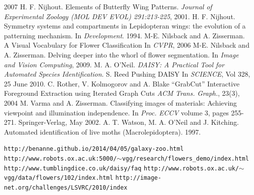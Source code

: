 \documentclass[11pt, titlepage, oneside]{article}
\theoremstyle{plain}
\theoremstyle{definition}
\theoremstyle{remark}
\begin{document}
\begin{thebibliography}{2}
		2007
		H. F. Nijhout.
		Elements of Butterfly Wing Patterns.
		\emph{Journal of Experimental Zoology (MOL DEV EVOL) 291:213-225},
		2001.
		H. F. Nijhout.
		Symmetry systems and compartments in Lepidopteran wings: the evolution of a patterning mechanism.
		In \emph{Development}.
		1994.
		M-E. Nilsback and A. Zisserman.
		A Visual Vocabulary for Flower Classification
		In \emph{CVPR},
		2006
		 M-E. Nilsback and A. Zisserman.
		 Delving deeper into the whorl of flower segmentation.
		 In \emph{Image and Vision Computing},
		 2009.
		M. A. O'Neil.
		\emph{DAISY: A Practical Tool for Automated Species Identification}.
		S. Reed
		Pushing DAISY
		In \emph{SCIENCE},
		Vol 328,
		25 June 2010.
		C. Rother, V. Kolmogorov and A. Blake
		``GrabCut''  Interactive Foreground Extraction using Iterated Graph Cuts
		\emph{ACM Trans. Graph.},
		23(3),
		2004
		M. Varma and A. Zisserman.
		Classifying images of materials: Achieving viewpoint and illumination independence.
		In \emph{Proc. ECCV}
		volume 3,
		pages 255-271.
		Springer-Verlag,
		May 2002.
		A. T. Watson, M. A. O'Neil and J. Kitching.
		Automated identification of live moths (Macrolepidoptera).
		1997.

		\texttt{http://benanne.github.io/2014/04/05/galaxy-zoo.html}
		\texttt{http://www.robots.ox.ac.uk:5000/$\sim$vgg/research/flowers\_demo/index.html}
		\texttt{http://www.tumblingdice.co.uk/daisy/faq}
		\texttt{http://www.robots.ox.ac.uk/$\sim$vgg/data/flowers/102/index.html}
		\texttt{http://image-net.org/challenges/LSVRC/2010/index}
\end{thebibliography}	

\end{document}
